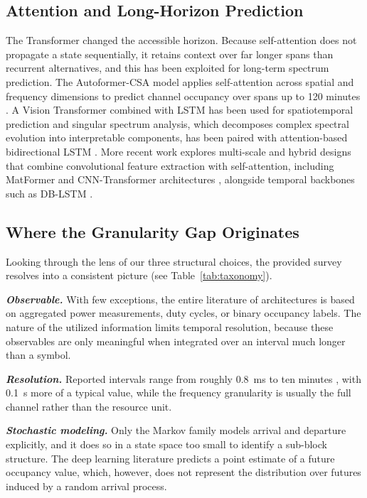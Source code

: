 \documentclass[lettersize,journal]{IEEEtran}
\begin{document}
\subsection{\textbf{Attention and Long-Horizon Prediction}}
The Transformer \cite{Vaswani2017} changed the accessible horizon.
Because self-attention does not propagate a state sequentially, it retains
context over far longer spans than recurrent alternatives, and this has
been exploited for long-term spectrum prediction.
The Autoformer-CSA model applies self-attention across spatial and frequency
dimensions to predict channel occupancy over spans up to 120 minutes
\cite{Pan2023}. A Vision Transformer combined with LSTM has been used for
spatiotemporal prediction \cite{Pan2026} and singular spectrum analysis, which decomposes
complex spectral evolution into interpretable components, has been
paired with attention-based bidirectional LSTM \cite{Ben2025}.
More recent work explores multi-scale and hybrid designs that combine
convolutional feature extraction with self-attention, including
MatFormer \cite{Li2025} and CNN-Transformer architectures
\cite{Guan2025}, alongside temporal backbones such as DB-LSTM
\cite{Xu2024}.

\subsection{\textbf{Where the Granularity Gap Originates}}
Looking through the lens of our three structural choices, the provided survey
resolves into a consistent picture (see Table~\ref{tab:taxonomy}).

\emph{\textbf{Observable.}} With few exceptions, the entire literature of
architectures is based on aggregated power measurements, 
duty cycles, or binary occupancy labels.
The nature of the utilized information limits temporal resolution, 
because these observables are only meaningful when 
integrated over an interval much longer than a symbol.

\emph{\textbf{Resolution.}} Reported intervals range from roughly 0.8~ms
\cite{Umebayashi2023} to ten minutes \cite{Li2021}, with 0.1~s
\cite{Chirov2023} more of a typical value, 
while the frequency granularity is usually the full
channel rather than the resource unit.

\emph{\textbf{Stochastic modeling.}} Only the Markov family models arrival and
departure explicitly, and it does so in a state space too small to
identify a sub-block structure. The deep learning literature predicts a
point estimate of a future occupancy value, which, however, does not represent the
distribution over futures induced by a random arrival process.
\end{document}
